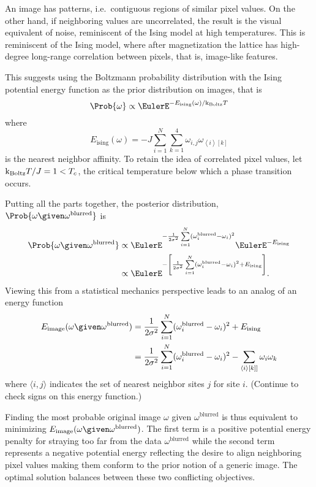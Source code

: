 \documentclass[12pt]{article}
\newcommand{\kT}{{\text k}_{\text{Boltz}}T}
\begin{document}
An image has patterns, i.e.\ contiguous regions of similar pixel
values. On the other hand, if neighboring values are uncorrelated, the
result is the visual equivalent of noise, reminiscent of the Ising
model at high temperatures.  This is reminiscent of the Ising model,
where after magnetization the lattice has high-degree long-range
correlation between pixels, that is, image-like features.

This suggests using the Boltzmann probability distribution with the
Ising potential energy function as the prior distribution on images, that is
\[
    \Prob{\omega} \propto \EulerE^{-E_{\text{ising}}(\omega)/\kT}
\] where
\[
    E_{\text{ising}}(\omega) = -J \sum\limits_{i=1}^{N} \sum\limits_{k=1}^4
    \omega_{i, j} \omega_{\left\langle i \right\rangle[k]}
\] is the nearest neighbor affinity. To retain the idea of correlated
pixel values, let \( \kT/J = 1 < T_c \), the critical temperature below
which a phase transition occurs.

Putting all the parts together, the posterior distribution, \( \Prob{\omega
\given \omega^{\text{blurred}}} \) is
\begin{align*}
    \Prob{\omega \given \omega^{\text{blurred}}} &\propto \EulerE^{-\frac
    {1}{2\sigma^2 } \sum\limits_{i=1}^N(\omega_i^{\text{blurred}} -
    \omega_i)^{2}} \EulerE^{-E_{\text{ising}}} \\
    &\propto \EulerE^{-\left[ \frac{1}{2\sigma^2 } \sum\limits_{i=1}^N(\omega_i^
    {\text{blurred}} - \omega_i)^{2} + E_{\text{ising}} \right] }.
\end{align*}
Viewing this from a statistical mechanics perspective leads to an analog
of an energy function
\begin{align*}
    E_{\text{image}}(\omega \given \omega^{\text{blurred}}) &= \frac{1}{2\sigma^2
    } \sum\limits_{i=1}^N(\omega_i^{\text{blurred}} - \omega_i)^{2} + E_
    {\text{ising}} \\
    &= \frac{1}{2\sigma^2 } \sum\limits_{i=1}^N(\omega_i^{\text{blurred}}
    - \omega_i)^{2} - \sum\limits_{\langle i\rangle [k]]} \omega_i\omega_k
    \\
\end{align*}
where \( {\langle i,j\rangle} \) indicates the set of nearest neighbor
sites \( j \) for site \( i \).  (Continue to check signs on this energy
function.)

Finding the most probable original image \( \omega \) given \( \omega^{\text
{blurred}} \) is thus equivalent to minimizing \( E_{\text{image}}(\omega
\given \omega^{\text{blurred}}) \).  The first term is a positive
potential energy penalty for straying too far from the data \( \omega^{\text
{blurred}} \) while the second term represents a negative potential
energy reflecting the desire to align neighboring pixel values making
them conform to the prior notion of a generic image.  The optimal
solution balances between these two conflicting objectives.
\end{document}
